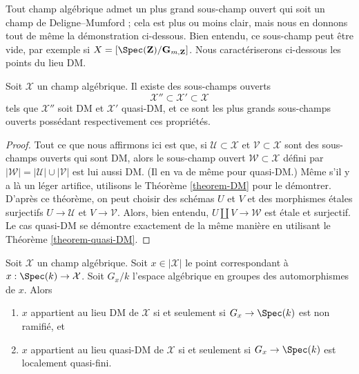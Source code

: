 \noindent
Tout champ algébrique admet un plus grand sous-champ ouvert qui soit un champ
de Deligne--Mumford ; cela est plus ou moins clair, mais nous en donnons tout
de même la démonstration ci-dessous. Bien entendu, ce sous-champ peut être
vide, par exemple si $X = [\Spec(\mathbf{Z})/\mathbf{G}_{m, \mathbf{Z}}]$.
Nous caractériserons ci-dessous les points du lieu DM.

\begin{lemma}
\label{lemma-open-DM-locus}
Soit $\mathcal{X}$ un champ algébrique. Il existe des sous-champs ouverts
$$
\mathcal{X}'' \subset \mathcal{X}' \subset \mathcal{X}
$$
tels que $\mathcal{X}''$ soit DM et $\mathcal{X}'$ quasi-DM, et ce sont les
plus grands sous-champs ouverts possédant respectivement ces propriétés.
\end{lemma}

\begin{proof}
Tout ce que nous affirmons ici est que, si
$\mathcal{U} \subset \mathcal{X}$ et $\mathcal{V} \subset \mathcal{X}$
sont des sous-champs ouverts qui sont DM, alors le sous-champ ouvert
$\mathcal{W} \subset \mathcal{X}$ défini par
$|\mathcal{W}| = |\mathcal{U}| \cup |\mathcal{V}|$ est lui aussi DM.
(Il en va de même pour quasi-DM.) Même s'il y a là un léger artifice,
utilisons le Théorème \ref{theorem-DM} pour le démontrer.
D'après ce théorème, on peut choisir des schémas $U$ et $V$ et des morphismes
étales surjectifs $U \to \mathcal{U}$ et $V \to \mathcal{V}$.
Alors, bien entendu, $U \amalg V \to \mathcal{W}$ est étale et surjectif.
Le cas quasi-DM se démontre exactement de la même manière en utilisant le
Théorème \ref{theorem-quasi-DM}.
\end{proof}

\begin{lemma}
\label{lemma-points-DM-locus}
Soit $\mathcal{X}$ un champ algébrique. Soit $x \in |\mathcal{X}|$ le point
correspondant à $x : \Spec(k) \to \mathcal{X}$. Soit $G_x/k$ l'espace
algébrique en groupes des automorphismes de $x$. Alors
\begin{enumerate}
\item $x$ appartient au lieu DM de $\mathcal{X}$ si et seulement si
$G_x \to \Spec(k)$ est non ramifié, et
\item $x$ appartient au lieu quasi-DM de $\mathcal{X}$ si et seulement si
$G_x \to \Spec(k)$ est localement quasi-fini.
\end{enumerate}
\end{lemma}

